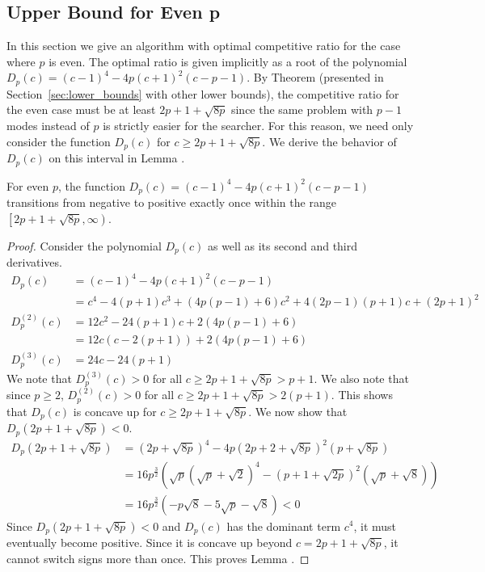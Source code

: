 \subsection{Upper Bound for Even p}
In this section we give an algorithm with optimal competitive ratio for the case where $p$ is even. 
The optimal ratio is given implicitly as a root of the polynomial $D_p(c) = (c-1)^4 - 4p(c+1)^2(c-p-1)$. 
By Theorem  (presented in Section~\ref{sec:lower_bounds} with other lower bounds), the competitive ratio for the even case must be at least $2p+1+\sqrt{8p}$ since the same problem with $p-1$ modes instead of $p$ is strictly easier for the searcher.
For this reason, we need only consider the function $D_p(c)$ for $c\geq 2p+1+\sqrt{8p}$. We derive the behavior of $D_p(c)$ on this interval in Lemma .
\begin{lemma} 
  For even $p$, the function $D_p(c) = (c-1)^4 - 4p(c+1)^2(c-p-1)$ transitions from negative to positive exactly once within the range $\left[2p+1+\sqrt{8p},\infty\right)$. 
\end{lemma}
\begin{proof}
  Consider the polynomial $D_p(c)$ as well as its second and third derivatives.
  \begin{align*}
    D_p(c) &= (c-1)^4 - 4p(c+1)^2(c-p-1) \\
    &= c^4 - 4(p+1)c^3 + (4p(p-1)+6)c^2 + 4(2p-1)(p+1)c + (2p+1)^2 \\
    D_p^{(2)}(c) &= 12c^2 - 24(p+1)c + 2(4p(p-1)+6) \\
    &= 12c(c-2(p+1)) + 2(4p(p-1)+6) \\
    D_p^{(3)}(c) &= 24c - 24(p+1)
  \end{align*}
  We note that $D_p^{(3)}(c) > 0$ for all $c \geq 2p+1+\sqrt{8p} > p+1$. We also note that since $p\geq 2$, $D_p^{(2)}(c) > 0$ for all $c \geq 2p+1+\sqrt{8p} > 2(p+1)$. This shows that $D_p(c)$ is concave up for $c \geq 2p+1+\sqrt{8p}$. We now show that $D_p(2p+1+\sqrt{8p})<0$.
  \begin{align*}
    D_p(2p+1+\sqrt{8p}) &= (2p+\sqrt{8p})^4 - 4p(2p+2+\sqrt{8p})^2(p+\sqrt{8p}) \\
    &= 16p^{\frac{3}{2}}\left(\sqrt{p}(\sqrt{p}+\sqrt{2})^4 - (p+1+\sqrt{2p})^2(\sqrt{p}+\sqrt{8})\right) \\
    &= 16p^{\frac{3}{2}}\left(-p\sqrt{8}-5\sqrt{p}-\sqrt{8}\right) < 0
  \end{align*}
  Since $D_p(2p+1+\sqrt{8p})<0$ and $D_p(c)$ has the dominant term $c^4$, it must eventually become positive. Since it is concave up beyond $c=2p+1+\sqrt{8p}$, it cannot switch signs more than once. This proves Lemma .
\end{proof}

